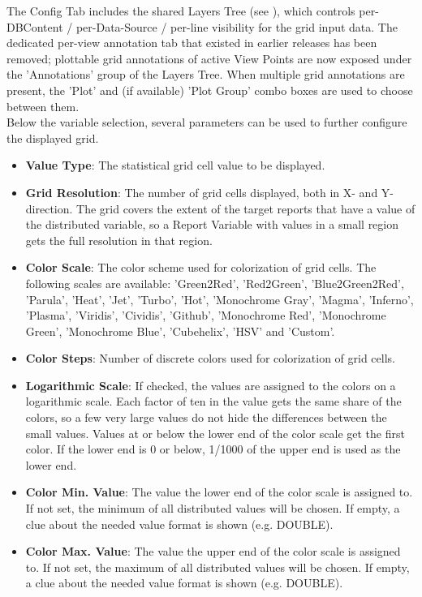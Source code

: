 The Config Tab includes the shared Layers Tree (see ), which controls per-DBContent / per-Data-Source / per-line visibility for the grid input data. The dedicated per-view annotation tab that existed in earlier releases has been removed; plottable grid annotations of active View Points are now exposed under the 'Annotations' group of the Layers Tree. When multiple grid annotations are present, the 'Plot' and (if available) 'Plot Group' combo boxes are used to choose between them. \\

Below the variable selection, several parameters can be used to further configure the displayed grid.

\begin{itemize}
    \item \textbf{Value Type}: The statistical grid cell value to be displayed.
    \item \textbf{Grid Resolution}: The number of grid cells displayed, both in X- and Y-direction. The grid covers the extent of the target reports that have a value of the distributed variable, so a Report Variable with values in a small region gets the full resolution in that region.
    \item \textbf{Color Scale}: The color scheme used for colorization of grid cells. The following scales are available: 'Green2Red', 'Red2Green', 'Blue2Green2Red', 'Parula', 'Heat', 'Jet', 'Turbo', 'Hot', 'Monochrome Gray', 'Magma', 'Inferno', 'Plasma', 'Viridis', 'Cividis', 'Github', 'Monochrome Red', 'Monochrome Green', 'Monochrome Blue', 'Cubehelix', 'HSV' and 'Custom'.
    \item \textbf{Color Steps}: Number of discrete colors used for colorization of grid cells.
    \item \textbf{Logarithmic Scale}: If checked, the values are assigned to the colors on a logarithmic scale. Each factor of ten in the value gets the same share of the colors, so a few very large values do not hide the differences between the small values. Values at or below the lower end of the color scale get the first color. If the lower end is 0 or below, 1/1000 of the upper end is used as the lower end.
    \item \textbf{Color Min. Value}: The value the lower end of the color scale is assigned to.
        If not set, the minimum of all distributed values will be chosen.
        If empty, a clue about the needed value format is shown (e.g. DOUBLE).
    \item \textbf{Color Max. Value}: The value the upper end of the color scale is assigned to.
        If not set, the maximum of all distributed values will be chosen.
        If empty, a clue about the needed value format is shown (e.g. DOUBLE).
   \end{itemize}
   \ \\

